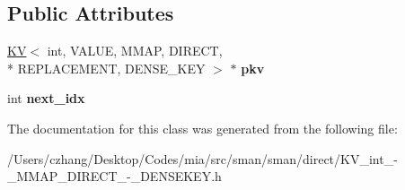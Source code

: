 \subsection*{Public Attributes}
\begin{DoxyCompactItemize}
\item 
\hypertarget{classmia_1_1sm_1_1_k_v_3_01int_00_01_v_a_l_u_e_00_01_m_m_a_p_00_01_d_i_r_e_c_t_00_01_r_e_p_l_a_c777ddd58bcfb92c8593dd8ce3d26b512_a747a5aec33063774ae16830e4863673e}{\hyperlink{classmia_1_1sm_1_1_k_v}{K\-V}$<$ int, V\-A\-L\-U\-E, M\-M\-A\-P, D\-I\-R\-E\-C\-T, \\*
R\-E\-P\-L\-A\-C\-E\-M\-E\-N\-T, D\-E\-N\-S\-E\-\_\-\-K\-E\-Y $>$ $\ast$ {\bfseries pkv}}\label{classmia_1_1sm_1_1_k_v_3_01int_00_01_v_a_l_u_e_00_01_m_m_a_p_00_01_d_i_r_e_c_t_00_01_r_e_p_l_a_c777ddd58bcfb92c8593dd8ce3d26b512_a747a5aec33063774ae16830e4863673e}

\item 
\hypertarget{classmia_1_1sm_1_1_k_v_3_01int_00_01_v_a_l_u_e_00_01_m_m_a_p_00_01_d_i_r_e_c_t_00_01_r_e_p_l_a_c777ddd58bcfb92c8593dd8ce3d26b512_a901615b5b979f1f641675dd383920adf}{int {\bfseries next\-\_\-idx}}\label{classmia_1_1sm_1_1_k_v_3_01int_00_01_v_a_l_u_e_00_01_m_m_a_p_00_01_d_i_r_e_c_t_00_01_r_e_p_l_a_c777ddd58bcfb92c8593dd8ce3d26b512_a901615b5b979f1f641675dd383920adf}

\end{DoxyCompactItemize}


The documentation for this class was generated from the following file\-:\begin{DoxyCompactItemize}
\item 
/\-Users/czhang/\-Desktop/\-Codes/mia/src/sman/sman/direct/K\-V\-\_\-int\-\_\--\/\-\_\-\-M\-M\-A\-P\-\_\-\-D\-I\-R\-E\-C\-T\-\_\--\/\-\_\-\-D\-E\-N\-S\-E\-K\-E\-Y.\-h\end{DoxyCompactItemize}

